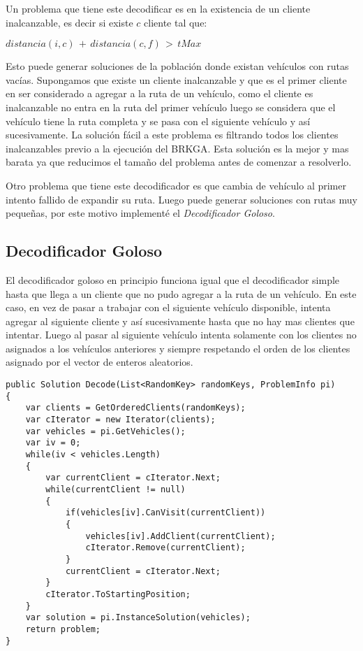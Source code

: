 \bigskip

Un problema que tiene este decodificar es en la existencia de un cliente inalcanzable, es decir si existe $c$ cliente tal que:

\bigskip

\( distancia(i, c)\, +\, distancia(c, f)\, >\, tMax\)

\bigskip

Esto puede generar soluciones de la población donde existan vehículos con rutas vacías. Supongamos que existe un cliente inalcanzable y que es el primer cliente en ser considerado a agregar a la ruta de un vehículo, como el cliente es inalcanzable no entra en la ruta del primer vehículo luego se considera que el vehículo tiene la ruta completa y se pasa con el siguiente vehículo y así sucesivamente. La solución fácil a este problema es filtrando todos los clientes inalcanzables previo a la ejecución del BRKGA. Esta solución es la mejor y mas barata ya que reducimos el tamaño del problema antes de comenzar a resolverlo.

\bigskip

Otro problema que tiene este decodificador es que cambia de vehículo al primer intento fallido de expandir su ruta. Luego puede generar soluciones con rutas muy pequeñas, por este motivo implementé el \textit{Decodificador Goloso}.


\subsection{Decodificador Goloso}

El decodificador goloso en principio funciona igual que el decodificador simple hasta que llega a un cliente que no pudo agregar a la ruta de un vehículo. En este caso, en vez de pasar a trabajar con el siguiente vehículo disponible, intenta agregar al siguiente cliente y así sucesivamente hasta que no hay mas clientes que intentar. Luego al pasar al siguiente vehículo intenta solamente con los clientes no asignados a los vehículos anteriores y siempre respetando el orden de los clientes asignado por el vector de enteros aleatorios.

\bigskip

\begin{lstlisting} 
public Solution Decode(List<RandomKey> randomKeys, ProblemInfo pi)
{
	var clients = GetOrderedClients(randomKeys);
	var cIterator = new Iterator(clients);
	var vehicles = pi.GetVehicles();	
	var iv = 0;
	while(iv < vehicles.Length)
	{
		var currentClient = cIterator.Next;
		while(currentClient != null)
		{
			if(vehicles[iv].CanVisit(currentClient))
			{
				vehicles[iv].AddClient(currentClient);
				cIterator.Remove(currentClient);
			}
			currentClient = cIterator.Next;
		}
		cIterator.ToStartingPosition;
	}
	var solution = pi.InstanceSolution(vehicles);
	return problem;
}
\end{lstlisting}

